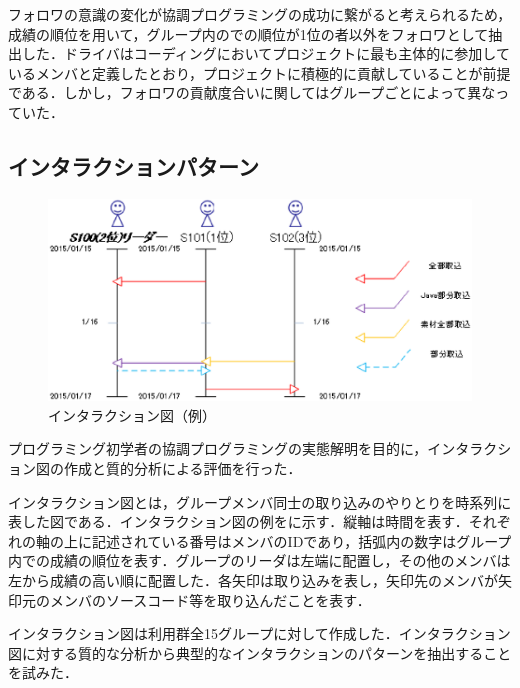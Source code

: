 フォロワの意識の変化が協調プログラミングの成功に繋がると考えられるため，成績の順位を用いて，グループ内のでの順位が1位の者以外をフォロワとして抽出した．ドライバはコーディングにおいてプロジェクトに最も主体的に参加しているメンバと定義したとおり，プロジェクトに積極的に貢献していることが前提である．しかし，フォロワの貢献度合いに関してはグループごとによって異なっていた．


\subsection{インタラクションパターン}


\begin{figure}[tb]
	\begin{center}
		\includegraphics[width=\linewidth]{img/flowSample.eps}
		\caption{インタラクション図（例）}
		\label{fig:flowSample}
	\end{center}
\end{figure}


プログラミング初学者の協調プログラミングの実態解明を目的に，インタラクション図の作成と質的分析による評価を行った．

インタラクション図とは，グループメンバ同士の取り込みのやりとりを時系列に表した図である．インタラクション図の例をに示す．縦軸は時間を表す．それぞれの軸の上に記述されている番号はメンバのIDであり，括弧内の数字はグループ内での成績の順位を表す．グループのリーダ\footnotemark[3] は左端に配置し，その他のメンバは左から成績の高い順に配置した．各矢印は取り込みを表し，矢印先のメンバが矢印元のメンバのソースコード等を取り込んだことを表す．


インタラクション図は利用群全15グループに対して作成した．インタラクション図に対する質的な分析から典型的なインタラクションのパターンを抽出することを試みた．

